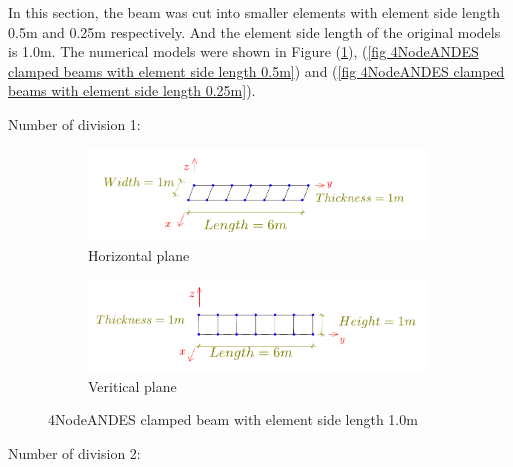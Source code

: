 \documentclass[fleqn,11pt,letter]{article}
\begin{document}
\newpage
In this section, the beam was cut into smaller elements with element side length 0.5m and 0.25m respectively. And the element side length of the original models is 1.0m. The numerical models were shown in Figure (\ref{fig 4NodeANDES clamped beams with element side length 1.0m}), (\ref{fig 4NodeANDES clamped beams with element side length 0.5m}) and (\ref{fig 4NodeANDES clamped beams with element side length 0.25m}). 

Number of division 1:

\begin{figure}[H]
  \centering
    \begin{subfigure}{0.5\textwidth}
      \centering
      \includegraphics[width=9cm]{../Figure_files/4NodeANDES/beam_ANDES_xy_bending.pdf}
      \caption{Horizontal plane}
    \end{subfigure}
    \begin{subfigure}{0.5\textwidth}
      \centering
      \includegraphics[width=9cm]{../Figure_files/4NodeANDES/beam_ANDES_yz_inPlane.pdf}
      \caption{Veritical  plane}
    \end{subfigure}
  \caption{4NodeANDES clamped beam with element side length 1.0m }
  \label{fig 4NodeANDES clamped beams with element side length 1.0m}
\end{figure}


Number of division 2:
\end{document}
